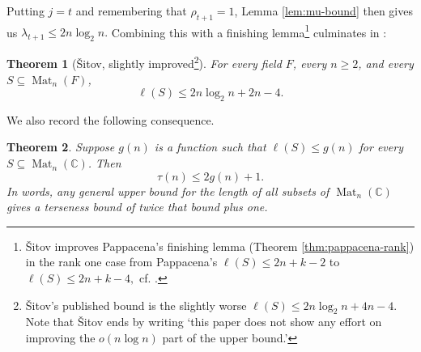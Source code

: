 \documentclass[11pt]{article}
\newtheorem{theorem}{Theorem}[section]
\renewcommand{\geq}{\geqslant}
\renewcommand{\leq}{\leqslant}
\newcommand{\C}{\mathbb{C}}
\newcommand{\calL}{\mathcal{L}}
\newcommand{\usim}{\sim_u}
\DeclareMathOperator{\tr}{tr}
\newcommand{\Mat}{\operatorname{Mat}}
\newtheorem{auxiliary proposition}[theorem]{Auxiliary Proposition}
\newtheorem{definition}[theorem]{Definition}
\newtheorem{main conjecture}[theorem]{Main Conjecture}
\newtheorem{main theorem}[theorem]{Main Theorem}
\newtheorem{modesty proposition}[theorem]{Modesty Proposition}
\newtheorem{open problem}[theorem]{Open Problem}
\newtheorem{remark}[theorem]{Remark}
\newtheorem{convergence lemma}[theorem]{Convergence Lemma}
\newtheorem{corrected lemma}[theorem]{Corrected Lemma}
\newtheorem{growth lemma}[theorem]{Growth Lemma}
\newtheorem{coefficient lemma}[theorem]{Integrality Lemma}
\newtheorem{interpolation lemma}[theorem]{Interpolation Lemma}
\newtheorem{kernel lemma}[theorem]{Kernel Lemma}
\newtheorem{limit lemma}[theorem]{Limit Lemma}
\newtheorem{tandem lemma}[theorem]{Modesty Lemma}
\newtheorem{zero-finding lemma}[theorem]{Zero-Finding Lemma}
\numberwithin{equation}{section}
\begin{document}
Putting $j=t$ and remembering that $\rho_{t+1}=1$, Lemma \ref{lem:mu-bound} then gives us $ \lambda_{t+1}\leq 2n\log_2n.$ Combining this with a finishing lemma\footnote{\v{S}itov improves Pappacena's finishing lemma (Theorem \ref{thm:pappacena-rank}) in the rank one case from Pappacena's $\ell(S)\leq 2n+k-2$ to
$\ell(S)\leq 2n+k-4,$ cf. \cite[Corollary~7]{Shitov2019}.} culminates in \cite[Theorem~3]{Shitov2019}:

\begin{theorem}[\v{S}itov, slightly improved\footnote{\v{S}itov's published bound is the slightly worse $\ell(S)\leq 2n\log_2 n+4n-4$. %
Note that \v{S}itov ends \cite{Shitov2019} by writing `this paper does not show any effort on improving the $o(n \log n)$ part of the upper bound.' }]
\label{thm:shitov-global}
For every field $F$, every $n\geq2$, and every $S\subseteq\Mat_n(F)$, $$\ell(S)\leq2n\log_2n+2n-4. $$
\end{theorem}


We also record the following consequence.%


\begin{theorem}\cite[Corollary~2.8]{FreedmanGuptaGuralnick1997}
\label{thm:specht-transfer}
Suppose $g(n)$ is a function such
that $\ell(S)\leq g(n)$ for every $S\subseteq\Mat_n(\C)$.  Then
$$ \tau(n)\leq2g(n)+1. $$ In words, any general upper bound for the length of all subsets of $\Mat_n(\C)$ gives a terseness bound of twice that bound plus one.
\end{theorem}
\end{document}
